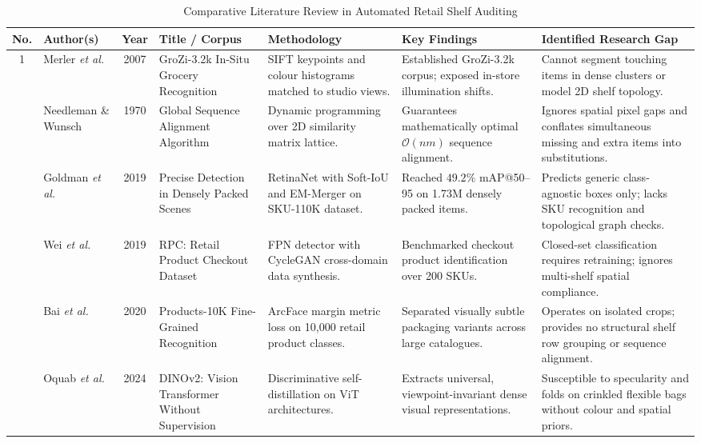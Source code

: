 \documentclass[conference]{IEEEtran}
\begin{document}
\begin{table}[t]
\centering
\caption{Comparative Literature Review in Automated Retail Shelf Auditing}
\label{tab:lit_review}
\scriptsize
\begin{tabularx}{\textwidth}{c l c p{2.8cm} p{3.2cm} p{3.2cm} X}
\toprule
\textbf{No.} & \textbf{Author(s)} & \textbf{Year} & \textbf{Title / Corpus} & \textbf{Methodology} & \textbf{Key Findings} & \textbf{Identified Research Gap} \\
\midrule
1 & Merler \textit{et al.}~\cite{merler2007grozi} & 2007 & GroZi-3.2k In-Situ Grocery Recognition & SIFT keypoints and colour histograms matched to studio views. & Established GroZi-3.2k corpus; exposed in-store illumination shifts. & Cannot segment touching items in dense clusters or model 2D shelf topology. \\
\addlinespace[3pt]
2 & Needleman \& Wunsch~\cite{needleman1970general} & 1970 & Global Sequence Alignment Algorithm & Dynamic programming over 2D similarity matrix lattice. & Guarantees mathematically optimal $\mathcal{O}(nm)$ sequence alignment. & Ignores spatial pixel gaps and conflates simultaneous missing and extra items into substitutions. \\
\addlinespace[3pt]
3 & Goldman \textit{et al.}~\cite{goldman2019precise} & 2019 & Precise Detection in Densely Packed Scenes & RetinaNet with Soft-IoU and EM-Merger on SKU-110K dataset. & Reached $49.2\%$ mAP@50--95 on 1.73M densely packed items. & Predicts generic class-agnostic boxes only; lacks SKU recognition and topological graph checks. \\
\addlinespace[3pt]
4 & Wei \textit{et al.}~\cite{wei2019rpc} & 2019 & RPC: Retail Product Checkout Dataset & FPN detector with CycleGAN cross-domain data synthesis. & Benchmarked checkout product identification over 200 SKUs. & Closed-set classification requires retraining; ignores multi-shelf spatial compliance. \\
\addlinespace[3pt]
5 & Bai \textit{et al.}~\cite{bai2020products10k} & 2020 & Products-10K Fine-Grained Recognition & ArcFace margin metric loss on 10,000 retail product classes. & Separated visually subtle packaging variants across large catalogues. & Operates on isolated crops; provides no structural shelf row grouping or sequence alignment. \\
\addlinespace[3pt]
6 & Oquab \textit{et al.}~\cite{oquab2023dinov2} & 2024 & DINOv2: Vision Transformer Without Supervision & Discriminative self-distillation on ViT architectures. & Extracts universal, viewpoint-invariant dense visual representations. & Susceptible to specularity and folds on crinkled flexible bags without colour and spatial priors. \\
\bottomrule
\end{tabularx}
\end{table}
\end{document}
